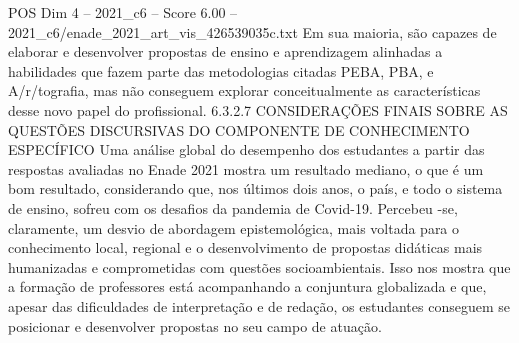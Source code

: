 \begin{textsample}{POS Dim 4 – 2021\_c6 – Score 6.00 – 2021\_c6/enade\_2021\_art\_vis\_426539035c.txt}
Em sua maioria, são capazes de elaborar e desenvolver propostas de ensino e aprendizagem alinhadas a habilidades que fazem parte das metodologias citadas PEBA, PBA, e A/r/tografia, mas não conseguem explorar conceitualmente as características desse novo papel do profissional. 6.3.2.7 CONSIDERAÇÕES FINAIS SOBRE AS QUESTÕES DISCURSIVAS DO COMPONENTE DE CONHECIMENTO ESPECÍFICO Uma análise global do desempenho dos estudantes a partir das respostas avaliadas no Enade 2021 mostra um resultado mediano, o que é um bom resultado, considerando que, nos últimos dois anos, o país, e todo o sistema de ensino, sofreu com os desafios da pandemia de Covid-19.
Percebeu -se, claramente, um desvio de abordagem epistemológica, mais voltada para o conhecimento local, regional e o desenvolvimento de propostas didáticas mais humanizadas e comprometidas com questões socioambientais.
Isso nos mostra que a formação de professores está acompanhando a conjuntura globalizada e que, apesar das dificuldades de interpretação e de redação, os estudantes conseguem se posicionar e desenvolver propostas no seu campo de atuação.

\end{textsample}
